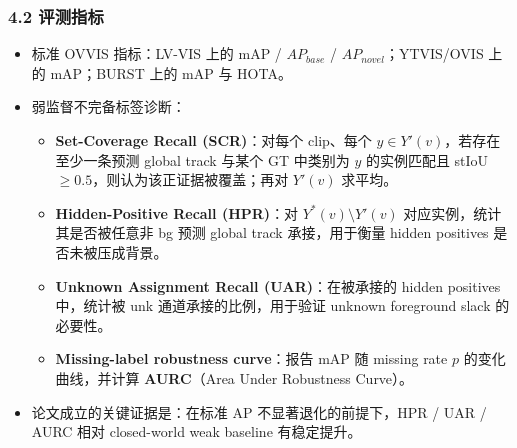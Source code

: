\documentclass[UTF8]{ctexart}
\begin{document}
\subsubsection*{4.2 评测指标}
\begin{itemize}
\item 标准 OVVIS 指标：LV-VIS 上的 mAP / $AP_{base}$ / $AP_{novel}$；YTVIS/OVIS 上的 mAP；BURST 上的 mAP 与 HOTA。
\item 弱监督不完备标签诊断：
\begin{itemize}
\item \textbf{Set-Coverage Recall (SCR)}：对每个 clip、每个 $y\in Y'(v)$，若存在至少一条预测 global track 与某个 GT 中类别为 $y$ 的实例匹配且 stIoU $\ge 0.5$，则认为该正证据被覆盖；再对 $Y'(v)$ 求平均。
\item \textbf{Hidden-Positive Recall (HPR)}：对 $Y^*(v)\setminus Y'(v)$ 对应实例，统计其是否被任意非 bg 预测 global track 承接，用于衡量 hidden positives 是否未被压成背景。
\item \textbf{Unknown Assignment Recall (UAR)}：在被承接的 hidden positives 中，统计被 unk 通道承接的比例，用于验证 unknown foreground slack 的必要性。
\item \textbf{Missing-label robustness curve}：报告 mAP 随 missing rate $p$ 的变化曲线，并计算 \textbf{AURC}（Area Under Robustness Curve）。
\end{itemize}
\item 论文成立的关键证据是：在标准 AP 不显著退化的前提下，HPR / UAR / AURC 相对 closed-world weak baseline 有稳定提升。
\end{itemize}
\end{document}

